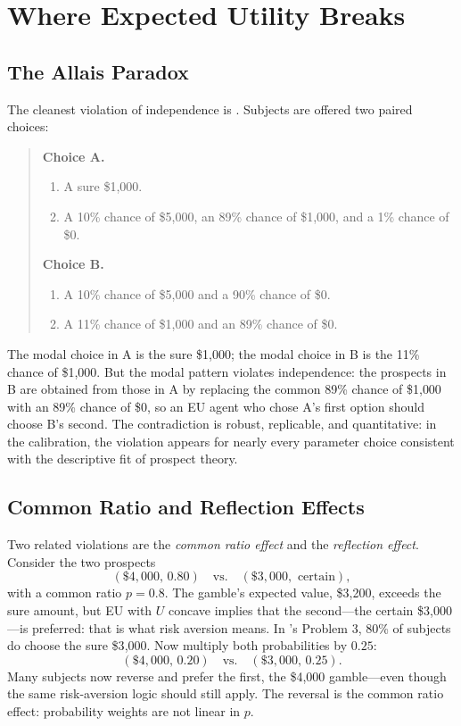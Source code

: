 \section{Where Expected Utility Breaks}
\label{sec:eufailures}

\subsection{The Allais Paradox}

The cleanest violation of independence is \citet{allais1953}. Subjects are offered two paired choices:

\begin{quote}
\textbf{Choice A.}
\begin{enumerate}[label=(\Alph*),itemsep=1pt]
\item A sure \$1{,}000.
\item A 10\% chance of \$5{,}000, an 89\% chance of \$1{,}000, and a 1\% chance of \$0.
\end{enumerate}
\textbf{Choice B.}
\begin{enumerate}[label=(\Alph*),itemsep=1pt,resume]
\item A 10\% chance of \$5{,}000 and a 90\% chance of \$0.
\item A 11\% chance of \$1{,}000 and an 89\% chance of \$0.
\end{enumerate}
\end{quote}

The modal choice in A is the sure \$1{,}000; the modal choice in B is the 11\% chance of \$1{,}000. But the modal pattern violates independence: the prospects in B are obtained from those in A by replacing the common 89\% chance of \$1{,}000 with an 89\% chance of \$0, so an EU agent who chose A's first option should choose B's second. The contradiction is robust, replicable, and quantitative: in the \citet{tversky1992} calibration, the violation appears for nearly every parameter choice consistent with the descriptive fit of prospect theory.

\subsection{Common Ratio and Reflection Effects}

Two related violations are the \emph{common ratio effect} and the \emph{reflection effect}. Consider the two prospects
\[
(\$4{,}000,\, 0.80) \quad \text{vs.} \quad (\$3{,}000,\text{ certain}),
\]
with a common ratio $p = 0.8$. The gamble's expected value, \$3{,}200, exceeds the sure amount, but EU with $U$ concave implies that the second---the certain \$3{,}000---is preferred: that is what risk aversion means. In \citet{kahneman1979}'s Problem 3, 80\% of subjects do choose the sure \$3{,}000. Now multiply both probabilities by $0.25$:
\[
(\$4{,}000,\, 0.20) \quad \text{vs.} \quad (\$3{,}000,\, 0.25).
\]
Many subjects now reverse and prefer the first, the \$4{,}000 gamble---even though the same risk-aversion logic should still apply. The reversal is the common ratio effect: probability weights are not linear in $p$.

